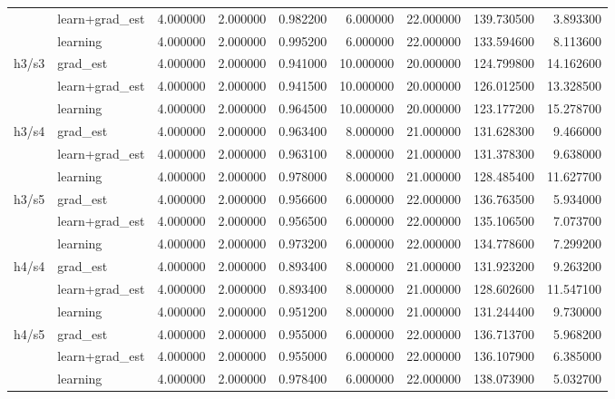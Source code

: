 \begin{tabular}{llllrrrrr}
\cline{2-9} \cline{3-9}
 & learn+grad_est & 4.000000 & 2.000000 & 0.982200 & 6.000000 & 22.000000 & 139.730500 & 3.893300 \\
\cline{2-9} \cline{3-9}
 & learning & 4.000000 & 2.000000 & 0.995200 & 6.000000 & 22.000000 & 133.594600 & 8.113600 \\
\cline{1-9} \cline{2-9} \cline{3-9}
\multirow[t]{3}{*}{h3/s3} & grad_est & 4.000000 & 2.000000 & 0.941000 & 10.000000 & 20.000000 & 124.799800 & 14.162600 \\
\cline{2-9} \cline{3-9}
 & learn+grad_est & 4.000000 & 2.000000 & 0.941500 & 10.000000 & 20.000000 & 126.012500 & 13.328500 \\
\cline{2-9} \cline{3-9}
 & learning & 4.000000 & 2.000000 & 0.964500 & 10.000000 & 20.000000 & 123.177200 & 15.278700 \\
\cline{1-9} \cline{2-9} \cline{3-9}
\multirow[t]{3}{*}{h3/s4} & grad_est & 4.000000 & 2.000000 & 0.963400 & 8.000000 & 21.000000 & 131.628300 & 9.466000 \\
\cline{2-9} \cline{3-9}
 & learn+grad_est & 4.000000 & 2.000000 & 0.963100 & 8.000000 & 21.000000 & 131.378300 & 9.638000 \\
\cline{2-9} \cline{3-9}
 & learning & 4.000000 & 2.000000 & 0.978000 & 8.000000 & 21.000000 & 128.485400 & 11.627700 \\
\cline{1-9} \cline{2-9} \cline{3-9}
\multirow[t]{3}{*}{h3/s5} & grad_est & 4.000000 & 2.000000 & 0.956600 & 6.000000 & 22.000000 & 136.763500 & 5.934000 \\
\cline{2-9} \cline{3-9}
 & learn+grad_est & 4.000000 & 2.000000 & 0.956500 & 6.000000 & 22.000000 & 135.106500 & 7.073700 \\
\cline{2-9} \cline{3-9}
 & learning & 4.000000 & 2.000000 & 0.973200 & 6.000000 & 22.000000 & 134.778600 & 7.299200 \\
\cline{1-9} \cline{2-9} \cline{3-9}
\multirow[t]{3}{*}{h4/s4} & grad_est & 4.000000 & 2.000000 & 0.893400 & 8.000000 & 21.000000 & 131.923200 & 9.263200 \\
\cline{2-9} \cline{3-9}
 & learn+grad_est & 4.000000 & 2.000000 & 0.893400 & 8.000000 & 21.000000 & 128.602600 & 11.547100 \\
\cline{2-9} \cline{3-9}
 & learning & 4.000000 & 2.000000 & 0.951200 & 8.000000 & 21.000000 & 131.244400 & 9.730000 \\
\cline{1-9} \cline{2-9} \cline{3-9}
\multirow[t]{3}{*}{h4/s5} & grad_est & 4.000000 & 2.000000 & 0.955000 & 6.000000 & 22.000000 & 136.713700 & 5.968200 \\
\cline{2-9} \cline{3-9}
 & learn+grad_est & 4.000000 & 2.000000 & 0.955000 & 6.000000 & 22.000000 & 136.107900 & 6.385000 \\
\cline{2-9} \cline{3-9}
 & learning & 4.000000 & 2.000000 & 0.978400 & 6.000000 & 22.000000 & 138.073900 & 5.032700 \\
\cline{1-9} \cline{2-9} \cline{3-9}
\bottomrule
\end{tabular}
